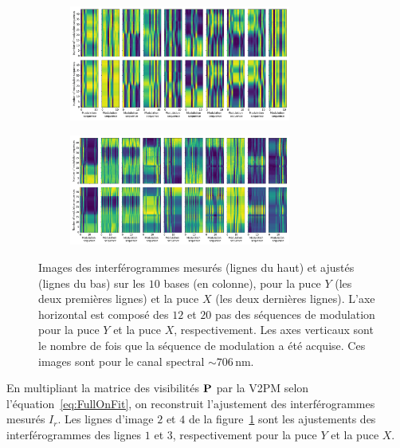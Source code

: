 \begin{figure}[ht!]
    \begin{subfigure}{\textwidth}
        \centering
        \includegraphics[width=0.8\textwidth]{Figure_Chap3/20221010_FringeFitting_TemporalModulation_Pola1_Base_LaTex.png}
    \end{subfigure}
    \begin{subfigure}{\textwidth}
        \centering
        \includegraphics[width=0.8\textwidth]{Figure_Chap3/20220811_FringeFitting_TemporalModulation_Pola1_Base_LaTex.png}
    \end{subfigure}
    \caption[Interférogrammes mesurés et ajustés par la P2VM des puces $Y$ et $X$ mesurés sur FIRSTv2.]{Images des interférogrammes mesurés (lignes du haut) et ajustés (lignes du bas) sur les $10$ bases (en colonne), pour la puce $Y$ (les deux premières lignes) et la puce $X$ (les deux dernières lignes). L'axe horizontal est composé des $12$ et $20$ pas des séquences de modulation pour la puce $Y$ et la puce $X$, respectivement. Les axes verticaux sont le nombre de fois que la séquence de modulation a été acquise. Ces images sont pour le canal spectral $\sim 706 \,$nm.}
    \label{fig:FullOnData}
\end{figure}

En multipliant la matrice des visibilités $\text{\textbf{P}}$ par la \ac{V2PM} selon l'équation~\ref{eq:FullOnFit}, on reconstruit l'ajustement des interférogrammes mesurés $I_r$. Les lignes d'image $2$ et $4$ de la figure~\ref{fig:FullOnData} sont les ajustements des interférogrammes des lignes $1$ et $3$, respectivement pour la puce $Y$ et la puce $X$.

